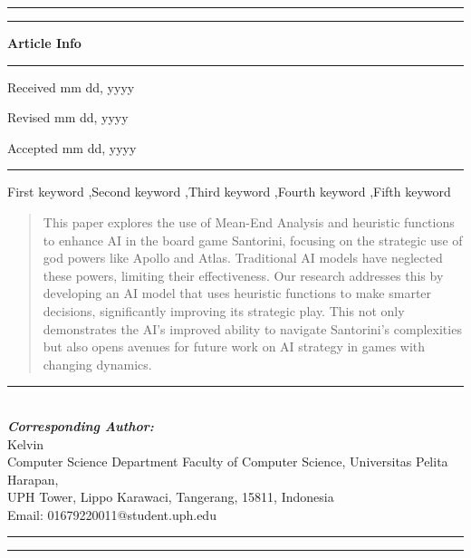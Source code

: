 \documentclass{telkomnika}
\begin{document}
\hrule
\vspace{.1em}
\hrule
\vspace{.5em}
\noindent
\parbox[t][][s]{0.315\textwidth}{%
\textbf{Article Info}
\vspace{.5em}
\hrule
\vspace{.5em}
\begin{history}
\vspace{.5em}

Received mm dd, yyyy

Revised mm dd, yyyy

Accepted mm dd, yyyy

\vspace{.7em}
\end{history}
\vspace{.5em}
\hrule
\vspace{.5em}
\begin{keyword} 
\vspace{.5em}
First keyword \sep Second keyword \sep Third keyword \sep Fourth keyword \sep Fifth keyword
\vspace{.5em}
\end{keyword}
\vspace{\fill}
}
\parbox{0.020\textwidth}{\hspace{.5em}}
\parbox[t][][s]{0.65\textwidth}{%
\begin{abstract}
\vspace{.3em}
This paper explores the use of Mean-End Analysis and heuristic functions to enhance AI in the board game Santorini, focusing on the strategic use of god powers like Apollo and Atlas. Traditional AI models have neglected these powers, limiting their effectiveness. Our research addresses this by developing an AI model that uses heuristic functions to make smarter decisions, significantly improving its strategic play. This not only demonstrates the AI's improved ability to navigate Santorini's complexities but also opens avenues for future work on AI strategy in games with changing dynamics.
\end{abstract}
}
\parbox[l]{\textwidth}{%
\rule{0.275\textwidth}{0.5pt} \hspace{0.5cm} \hrulefill
\\
\emph{\textbf{Corresponding Author:}}
\vspace{.5em}\\
Kelvin\\
Computer Science Department Faculty of Computer Science, Universitas Pelita Harapan,\\
UPH Tower, Lippo Karawaci, Tangerang, 15811, Indonesia\\
Email: 01679220011@student.uph.edu
}
\vspace{.5em}
\hrule
\vspace{.1em}
\hrule
\end{document}
